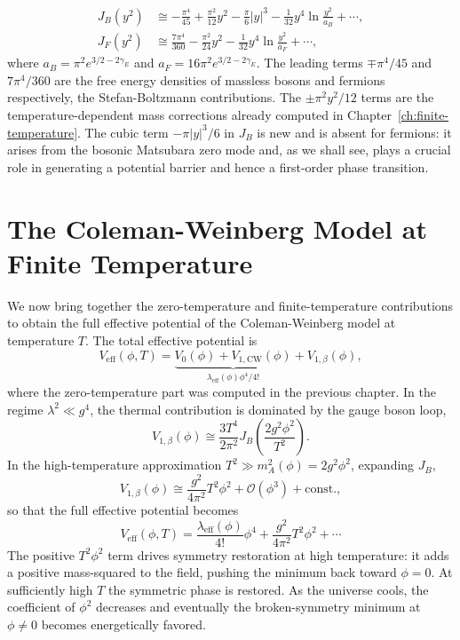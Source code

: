 \begin{align}
	J_B(y^2) & \cong -\frac{\pi^4}{45}
	+ \frac{\pi^2}{12}y^2
	- \frac{\pi}{6}|y|^3
	- \frac{1}{32}y^4\ln\frac{y^2}{a_B}
	+ \cdots,                           \\
	J_F(y^2) & \cong \frac{7\pi^4}{360}
	- \frac{\pi^2}{24}y^2
	- \frac{1}{32}y^4\ln\frac{y^2}{a_F}
	+ \cdots,
\end{align}
where $a_B = \pi^2 e^{3/2-2\gamma_E}$ and
$a_F = 16\pi^2 e^{3/2-2\gamma_E}$. The leading terms $\mp\pi^4/45$
and $7\pi^4/360$ are the free energy densities of massless bosons and
fermions respectively, the Stefan-Boltzmann contributions. The
$\pm\pi^2 y^2/12$ terms are the temperature-dependent mass corrections
already computed in Chapter~\ref{ch:finite-temperature}. The cubic
term $-\pi|y|^3/6$ in $J_B$ is new and is absent for fermions: it
arises from the bosonic Matsubara zero mode and, as we shall see, plays
a crucial role in generating a potential barrier and hence a first-order
phase transition.

\section{The Coleman-Weinberg Model at Finite Temperature}

We now bring together the zero-temperature and finite-temperature
contributions to obtain the full effective potential of the
Coleman-Weinberg model at temperature $T$. The total effective potential
is
\begin{equation}
	V_{\text{eff}}(\phi,T)
	= \underbrace{V_0(\phi) + V_{1,\text{CW}}(\phi)}_{
		\lambda_{\text{eff}}(\phi)\phi^4/4!}
	+ V_{1,\beta}(\phi),
	\label{eq:tot-eff-pot}
\end{equation}
where the zero-temperature part was computed in the previous chapter.
In the regime $\lambda^2\ll g^4$, the thermal contribution is dominated
by the gauge boson loop,
\begin{equation}
	V_{1,\beta}(\phi)
	\cong \frac{3T^4}{2\pi^2}
	J_B\!\left(\frac{2g^2\phi^2}{T^2}\right).
\end{equation}
In the high-temperature approximation $T^2\gg m_A^2(\phi) = 2g^2\phi^2$,
expanding $J_B$,
\begin{equation}
	V_{1,\beta}(\phi)
	\cong \frac{g^2}{4\pi^2}T^2\phi^2
	+ \mathcal{O}(\phi^3) + \text{const.},
\end{equation}
so that the full effective potential becomes
\begin{equation}
	V_{\text{eff}}(\phi,T)
	= \frac{\lambda_{\text{eff}}(\phi)}{4!}\phi^4
	+ \frac{g^2}{4\pi^2}T^2\phi^2 + \cdots
\end{equation}
The positive $T^2\phi^2$ term drives symmetry restoration at high
temperature: it adds a positive mass-squared to the field, pushing the
minimum back toward $\phi = 0$. At sufficiently high $T$ the symmetric
phase is restored. As the universe cools, the coefficient of $\phi^2$
decreases and eventually the broken-symmetry minimum at $\phi\neq 0$
becomes energetically favored.

